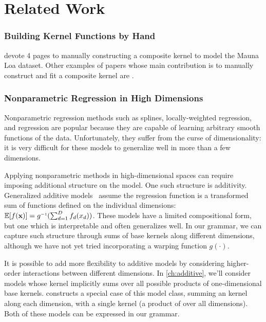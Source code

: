 




\section{Related Work}
\label{sec:gpss-related-work}

\def\rwsheader{\subsubsection}

\rwsheader{Building Kernel Functions by Hand}
\citet[Chapter 5]{rasmussen38gaussian} devote 4 pages to manually constructing a composite kernel to model the Mauna Loa dataset.
Other examples of papers whose main contribution is to manually construct and fit a composite \gp{} kernel are \citet{EdgarTelescope,lloydgefcom2012,textperiodic13}.


\rwsheader{Nonparametric Regression in High Dimensions}
Nonparametric regression methods such as splines, locally-weighted regression, and \gp{} regression are popular because they are capable of learning arbitrary smooth functions of the data.
Unfortunately, they suffer from the curse of dimensionality: it is very difficult for these models to generalize well in more than a few dimensions.

Applying nonparametric methods in high-dimensional spaces can require imposing additional structure on the model.
One such structure is additivity.
Generalized additive models~\citep{hastie1990generalized} assume the regression function is a transformed sum of functions defined on the individual dimensions: $\expect[f(\vx)] = g\inv(\sum_{d=1}^D f_d(x_d))$.
These models have a limited compositional form, but one which is interpretable and often generalizes well.
In our grammar, we can capture such structure through sums of base kernels along different dimensions, although we have not yet tried incorporating a warping function $g(\cdot)$.

It is possible to add more flexibility to additive models by considering higher-order interactions between different dimensions. 
In \cref{ch:additive}, we'll consider \gp{} models whose kernel implicitly sums over all possible products of one-dimensional base kernels.
\citet{plate1999accuracy} constructs a special case of this model class, summing an \kSE{} kernel along each dimension, with a single \seard{} kernel (a product of \kSE{} over all dimensions).
Both of these models can be expressed in our grammar.

